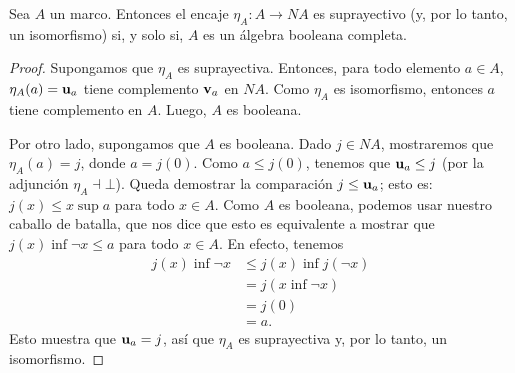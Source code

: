 \begin{theorem}
  \label{thm:ensamble-booleanidad}
  Sea $A$ un marco.
  Entonces el encaje $\eta_A:A\to NA$ es suprayectivo (y, por lo
  tanto, un isomorfismo) si, y solo
  si, $A$ es un álgebra booleana completa.
\end{theorem}
\begin{proof}
    Supongamos que $\eta_A$ es suprayectiva.
    Entonces, para todo elemento $a\in A$,
    $\eta_A(a)=\mathbf u_{a}$ tiene complemento $\mathbf v_{a}$ en $NA$.
    Como $\eta_A$ es isomorfismo, entonces
    $a$ tiene complemento en $A$.
    Luego, $A$ es booleana.
    
    Por otro lado, supongamos que $A$ es booleana.
    Dado $j\in NA$, mostraremos que $\eta_A(a)=j$,
    donde $a=j(0)$.
    Como $a\leq j(0)$, tenemos que $\mathbf u_{a}\leq j$
    (por la adjunción $\eta_A\dashv\bot$).
    Queda demostrar la comparación $j\leq\mathbf u_{a}$;
    esto es: $j(x)\leq x\sup a$ para todo $x\in A$.
    Como $A$ es booleana, podemos usar nuestro
    caballo de batalla, que nos dice que esto es equivalente
    a mostrar que $j(x)\inf\neg x\leq a$ para todo $x\in A$.
    En efecto, tenemos
    \begin{align*}
        j(x)\inf\neg x
        &\leq j(x)\inf j(\neg x) \\
        &= j(x\inf\neg x) \\
        &= j(0) \\
        &= a.
    \end{align*}
    Esto muestra que $\mathbf u_{a}=j$,
    así que $\eta_A$ es suprayectiva y,
    por lo tanto, un isomorfismo.
\end{proof}


